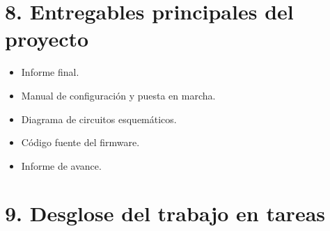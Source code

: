 \documentclass[
11pt, %
]{charter}
\begin{document}
\section{8. Entregables principales del proyecto}
\label{sec:entregables}

\begin{itemize}
	\item Informe final.
	\item Manual de configuración y puesta en marcha.
	\item Diagrama de circuitos esquemáticos.
	\item Código fuente del firmware.
	\item Informe de avance. 
\end{itemize}


\section{9. Desglose del trabajo en tareas}
\label{sec:wbs}
\end{document}
